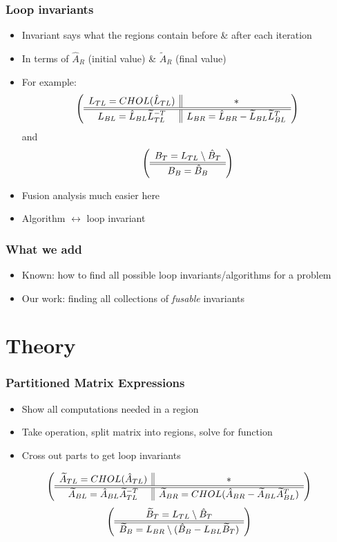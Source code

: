 \documentclass{beamer}
\begin{document}
\begin{frame}
  \frametitle{Loop invariants}
  \begin{itemize}
  \item Invariant says what the regions contain before \& after each iteration
  \item In terms of $\hat{A}_R$ (initial value) \& $\widetilde{A}_R$ (final value)
  \item For example:
    \begin{equation*}
      \left( \begin{array}{c || c} L_{TL} = CHOL(\hat{L}_{TL}) & * \\ \hline \hline L_{BL} = \hat{L}_{BL}\widetilde{L}_{TL}^{-T} & L_{BR} = \hat{L}_{BR} - \widetilde{L}_{BL}\widetilde{L}_{BL}^T \end{array} \right)
    \end{equation*}
    and
    \begin{equation*}
      \left( \begin{array}{c} B_T = L_{TL} \setminus \hat{B}_T \\ \hline \hline B_B = \hat{B}_B \end{array} \right)
    \end{equation*}
  \item Fusion analysis much easier here
  \item Algorithm $\leftrightarrow$ loop invariant
  \end{itemize}
\end{frame}

\begin{frame}
  \frametitle{What we add}
  \begin{itemize}
  \item Known: how to find all possible loop invariants/algorithms for a problem
  \item Our work: finding all collections of \emph{fusable} invariants
  \end{itemize}
\end{frame}

\section{Theory}
\frame{\sectionpage}

\begin{frame}
  \frametitle{Partitioned Matrix Expressions}
  \begin{itemize}
  \item Show all computations needed in a region
  \item Take operation, split matrix into regions, solve for function
  \item Cross out parts to get loop invariants
  \end{itemize}
  \begin{equation*}
    \left( \begin{array}{c || c} \widetilde{A}_{TL} = CHOL(\hat{A}_{TL}) & * \\ \hline \hline \widetilde{A}_{BL} = \hat{A}_{BL}\widetilde{A}_{TL}^{-T} & \widetilde{A}_{BR} = CHOL(\hat{A}_{BR} - \widetilde{A}_{BL}\widetilde{A}_{BL}^T) \end{array} \right)
  \end{equation*}
  \begin{equation*}
   \left( \begin{array}{c} \widetilde{B}_T =  L_{TL} \setminus \hat{B}_T \\ \hline \hline \widetilde{B}_B = L_{BR} \setminus (\hat{B}_B - L_{BL}\widetilde{B}_T) \end{array} \right)
 \end{equation*}
\end{frame}
\end{document}
